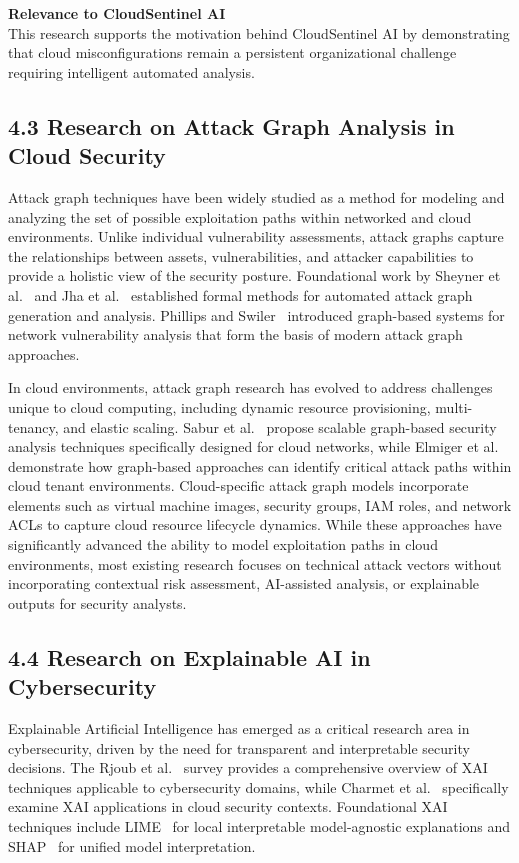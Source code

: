 \textbf{Relevance to CloudSentinel AI}\\
This research supports the motivation behind CloudSentinel AI by demonstrating that cloud misconfigurations remain a persistent organizational challenge requiring intelligent automated analysis.

\subsection{4.3 Research on Attack Graph Analysis in Cloud Security}

Attack graph techniques have been widely studied as a method for modeling and analyzing the set of possible exploitation paths within networked and cloud environments. Unlike individual vulnerability assessments, attack graphs capture the relationships between assets, vulnerabilities, and attacker capabilities to provide a holistic view of the security posture. Foundational work by Sheyner et al.~\cite{sheyner2002automated} and Jha et al.~\cite{jha2002formal} established formal methods for automated attack graph generation and analysis. Phillips and Swiler~\cite{phillips1998graph} introduced graph-based systems for network vulnerability analysis that form the basis of modern attack graph approaches.

In cloud environments, attack graph research has evolved to address challenges unique to cloud computing, including dynamic resource provisioning, multi-tenancy, and elastic scaling. Sabur et al.~\cite{sabur2022scalable} propose scalable graph-based security analysis techniques specifically designed for cloud networks, while Elmiger et al.~\cite{elmiger2023attackpaths} demonstrate how graph-based approaches can identify critical attack paths within cloud tenant environments. Cloud-specific attack graph models incorporate elements such as virtual machine images, security groups, IAM roles, and network ACLs to capture cloud resource lifecycle dynamics. While these approaches have significantly advanced the ability to model exploitation paths in cloud environments, most existing research focuses on technical attack vectors without incorporating contextual risk assessment, AI-assisted analysis, or explainable outputs for security analysts.

\subsection{4.4 Research on Explainable AI in Cybersecurity}

Explainable Artificial Intelligence has emerged as a critical research area in cybersecurity, driven by the need for transparent and interpretable security decisions. The Rjoub et al.~\cite{rjoub2023xai} survey provides a comprehensive overview of XAI techniques applicable to cybersecurity domains, while Charmet et al.~\cite{charmet2022xai} specifically examine XAI applications in cloud security contexts. Foundational XAI techniques include LIME~\cite{ribeiro2016lime} for local interpretable model-agnostic explanations and SHAP~\cite{lundberg2017shap} for unified model interpretation.

